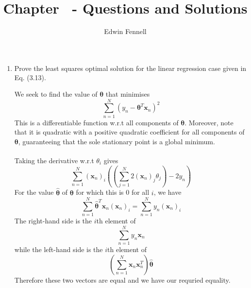 \documentclass{article}
\title{Chapter \chapternumber\ - Questions and Solutions}
\author{Edwin Fennell}
\date{}
\newcommand{\chapternumber}{3}
\newenvironment{QandA}{\begin{enumerate}[label=\chapternumber.\arabic*]\bfseries\boldmath}
	{\end{enumerate}}
\newenvironment{answered}{\par\bigskip\normalfont\unboldmath}{}
\begin{document}
	
	\maketitle
	
	\noindent%
	\begin{QandA}
		\item Prove the least squares optimal solution for the linear regression case given in Eq. (3.13).
		\begin{answered}
			We seek to find the value of $\boldsymbol{\theta}$ that minimises
			\[\sum_{n=1}^N(y_n-\boldsymbol{\theta}^T\textbf{x}_n)^2\]
			This is a differentiable function w.r.t all components of $\boldsymbol{\theta}$. Moreover, note that it is quadratic with a positive quadratic coefficient for all components of $\boldsymbol{\theta}$, guaranteeing that the sole stationary point is a global minimum.\\
			\\
			Taking the derivative w.r.t $\theta_i$ gives
			\[\sum_{n=1}^N(\textbf{x}_n)_i\left(\left(\sum_{j=1}^{N}2(\textbf{x}_n)_j\theta_j\right)-2y_n\right)\]
			For the value $\boldsymbol{\hat\theta}$ of $\boldsymbol{\theta}$ for which this is 0 for all $i$, we have
			\[\sum_{n=1}^N\boldsymbol{\hat\theta}^T\textbf{x}_n(\textbf{x}_n)_i=\sum_{n=1}^Ny_n(\textbf{x}_n)_i\]
			The right-hand side is the $i$th element of 
			\[\sum_{n=1}^{N}y_n\textbf{x}_n\]
			while the left-hand side is the $i$th element of 
			\[\left(\sum_{n=1}^{N}\textbf{x}_n\textbf{x}_n^T\right)\boldsymbol{\hat\theta}\]
			Therefore these two vectors are equal and we have our requried equality.
			

\end{answered}
\end{QandA}
\end{document}
